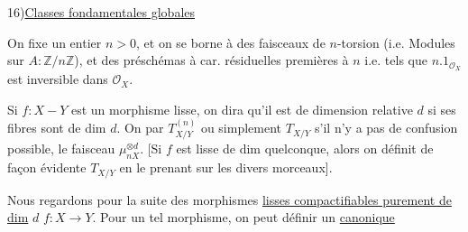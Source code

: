 16)\quad\uline{Classes fondamentales globales}

On fixe un entier $n>0$, et on se
borne à des faisceaux de $n$-torsion (i.e. Modules sur $A:\mathbb Z/n\mathbb Z$),
et des préschémas à car. résiduelles premières à $n$
i.e. tels que $n.1_{\mathcal O_X}$ est inversible dans $\mathcal O_X$.

Si $f:X\mathbin{-}Y$ est un morphisme lisse, on dira qu'il est
 de dimension relative $d$ si ses fibres sont
 de dim $d$.
On  par $T^{(n)}_{X/Y}$ ou simplement $T_{X/Y}$
s'il n'y a pas de confusion possible, le faisceau
$\mu_{nX}^{\otimes d}$.
[Si $f$ est lisse de dim  quelconque,
alors on définit de façon évidente $T_{X/Y}$ en le prenant sur les divers morceaux].

Nous regardons pour la suite des morphismes
\uline{lisses compactifiables purement de dim} $d$
$f:X\longrightarrow Y$.
Pour un tel morphisme, on peut définir un
\uline{  canonique}
